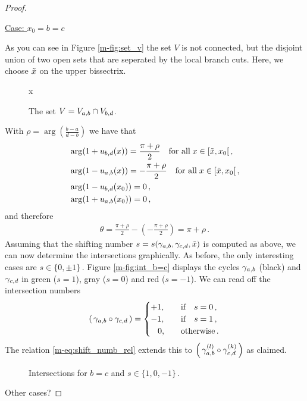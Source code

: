 \documentclass[main.tex]{subfiles}
\begin{document}
\begin{proof}
\begin{itemize}
  
  \begin{center}
   \underline{Case: $x_0 = b = c$}
  \end{center}
  As you can see in Figure \ref{m-fig:set_v} the set $V$ is not connected, but the disjoint union of two open sets that are seperated by the local branch cuts. Here, we choose $\tilde{x}$ on the upper bissectrix.
   \begin{figure}[H]
      \begin{center}
	  
      \end{center}x
    \caption{The set $V = V_{a,b} \cap V_{b,d}$.}
    \label{fig:set_v}
\end{figure}
  With $\rho = \arg\left(\frac{b-a}{d-b}\right)$ we have that
  \begin{align*}
   & \arg (1+u_{b,d}(x)) = \frac{\pi+\rho}{2} \quad \text{for all} \; x \in [\tilde{x},x_0[\,,\\
   & \arg (1-u_{a,b}(x)) = -\frac{\pi+\rho}{2} \quad \text{for all} \; x \in [\tilde{x},x_0[\,,\\
   & \arg (1-u_{b,d}(x_0)) = 0\,,\\ 
   & \arg (1+u_{a,b}(x_0))= 0\,,
  \end{align*}
  and therefore 
  \begin{align*}
   \theta = \frac{\pi+\rho}{2} - \left(-\frac{\pi+\rho}{2}\right) = \pi + \rho\,.
  \end{align*}
  Assuming that the shifting number $s=s(\gamma_{a,b},\gamma_{c,d},\tilde{x})$ is computed as above, we can now determine the intersections graphically. \abstandl
  As before, the only interesting cases
  are $s \in \{0,\pm 1\}$\,. Figure \ref{m-fig:int_b=c} displays the cycles $\gamma_{a,b}$ (black) and $\gamma_{c,d}$ in green ($s=1$), gray ($s=0$) and red ($s=-1$). 
  We can read off the intersection numbers
  \begin{align*}
    \left(\,\gamma_{a,b} \circ \gamma_{c,d}\,\right) = \begin{cases}
                                          +1, \quad & \text{if} \quad s=0\,,\\
                                          -1, \quad & \text{if} \quad s=1\,,\\
                                          \quad\!0, \quad & \text{otherwise}\,.
                                         \end{cases}
  \end{align*}
  The relation \eqref{m-eq:shift_numb_rel} extends this to $\left(\,\gamma_{a,b}^{(l)} \circ \gamma_{c,d}^{(k)}\,\right)$ as claimed. 
  \begin{figure}[H]
      \begin{center}
	  
      \end{center}
    \caption{Intersections for $b=c$ and $s \in \{1,0,-1\}$\,.}
    \label{fig:int_b=c}
\end{figure}
	\end{itemize}
	\todo Other cases?
  \end{proof}
	
\end{document}
